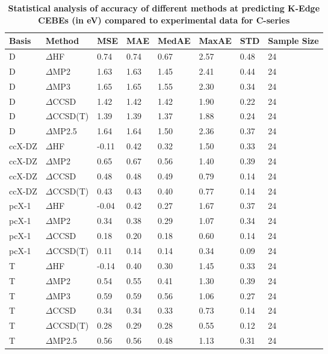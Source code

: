 \begin{table}
  \caption{\textbf{Statistical analysis of accuracy of different methods at predicting K-Edge CEBEs (in eV) compared to experimental data for C-series}}
  \label{tbl:method-summary-c}
  \begin{tabular}{l l l l l l l l }
    \toprule
    \textbf{Basis} & \textbf{Method} & \textbf{MSE} & \textbf{MAE} & \textbf{MedAE} & \textbf{MaxAE} & \textbf{STD} & \textbf{Sample Size} \\ 
    \midrule
    D & $\Delta$HF & 0.74 & 0.74 & 0.67 & 2.57 & 0.48 & 24 \\ 
    D & $\Delta$MP2 & 1.63 & 1.63 & 1.45 & 2.41 & 0.44 & 24 \\ 
    D & $\Delta$MP3 & 1.65 & 1.65 & 1.55 & 2.30 & 0.34 & 24 \\ 
    D & $\Delta$CCSD & 1.42 & 1.42 & 1.42 & 1.90 & 0.22 & 24 \\ 
    D & $\Delta$CCSD(T) & 1.39 & 1.39 & 1.37 & 1.88 & 0.24 & 24 \\ 
    D & $\Delta$MP2.5 & 1.64 & 1.64 & 1.50 & 2.36 & 0.37 & 24 \\ 
    ccX-DZ & $\Delta$HF & -0.11 & 0.42 & 0.32 & 1.50 & 0.33 & 24 \\ 
    ccX-DZ & $\Delta$MP2 & 0.65 & 0.67 & 0.56 & 1.40 & 0.39 & 24 \\ 
    ccX-DZ & $\Delta$CCSD & 0.48 & 0.48 & 0.49 & 0.79 & 0.14 & 24 \\ 
    ccX-DZ & $\Delta$CCSD(T) & 0.43 & 0.43 & 0.40 & 0.77 & 0.14 & 24 \\ 
    pcX-1 & $\Delta$HF & -0.04 & 0.42 & 0.27 & 1.67 & 0.37 & 24 \\ 
    pcX-1 & $\Delta$MP2 & 0.34 & 0.38 & 0.29 & 1.07 & 0.34 & 24 \\ 
    pcX-1 & $\Delta$CCSD & 0.18 & 0.20 & 0.18 & 0.60 & 0.14 & 24 \\ 
    pcX-1 & $\Delta$CCSD(T) & 0.11 & 0.14 & 0.14 & 0.34 & 0.09 & 24 \\ 
    T & $\Delta$HF & -0.14 & 0.40 & 0.30 & 1.45 & 0.33 & 24 \\ 
    T & $\Delta$MP2 & 0.54 & 0.55 & 0.41 & 1.30 & 0.39 & 24 \\ 
    T & $\Delta$MP3 & 0.59 & 0.59 & 0.56 & 1.06 & 0.27 & 24 \\ 
    T & $\Delta$CCSD & 0.34 & 0.34 & 0.33 & 0.73 & 0.14 & 24 \\ 
    T & $\Delta$CCSD(T) & 0.28 & 0.29 & 0.28 & 0.55 & 0.12 & 24 \\ 
    T & $\Delta$MP2.5 & 0.56 & 0.56 & 0.48 & 1.13 & 0.31 & 24 \\ 

\end{tabular}
\end{table}
